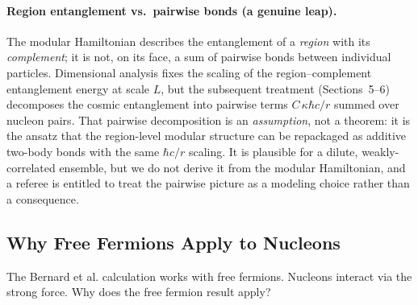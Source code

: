 \documentclass[11pt,letterpaper]{article}
\begin{document}
\paragraph{Region entanglement vs.\ pairwise bonds (a genuine leap).}
The modular Hamiltonian describes the entanglement of a \emph{region} with its
\emph{complement}; it is not, on its face, a sum of pairwise bonds between
individual particles. Dimensional analysis fixes the scaling of the
region--complement entanglement energy at scale $L$, but the subsequent
treatment (Sections~5--6) decomposes the cosmic entanglement into pairwise terms
$C\,\kappa\hbar c/r$ summed over nucleon pairs. That pairwise decomposition is an
\emph{assumption}, not a theorem: it is the ansatz that the region-level modular
structure can be repackaged as additive two-body bonds with the same $\hbar c/r$
scaling. It is plausible for a dilute, weakly-correlated ensemble, but we do not
derive it from the modular Hamiltonian, and a referee is entitled to treat the
pairwise picture as a modeling choice rather than a consequence.

\subsection{Why Free Fermions Apply to Nucleons}

The Bernard et al. calculation works with free fermions. Nucleons interact via
the strong force. Why does the free fermion result apply?
\end{document}

